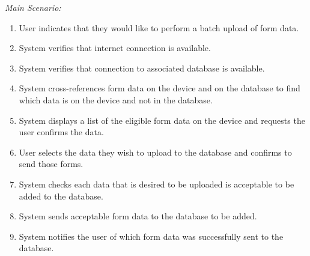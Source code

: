 \documentclass[twoside,letterpaper]{article}
\begin{document}
{\color{black} \textit{Main Scenario:}}
\begin{enumerate}
\item User indicates that they would like to perform a batch upload of form data.
\item System verifies that internet connection is available.
\item System verifies that connection to associated database is available.
\item System cross-references form data on the device and on the database to find which data is on the device and not in the database.
\item System displays a list of the eligible form data on the device and requests the user confirms the data.
\item User selects the data they wish to upload to the database and confirms to send those forms.
\item System checks each data that is desired to be uploaded is acceptable to be added to the database.
\item System sends acceptable form data to the database to be added.
\item System notifies the user of which form data was successfully sent to the database.
\end{enumerate}
\end{document}
